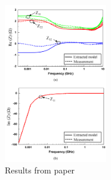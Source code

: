 \begin{figure}[htbp]
    \center
    \includegraphics[width = 0.4\textwidth]{img/zmatrix-paper}
    \caption{Results from paper}
    \end{figure}
    \label{fig:zmatrix-paper}
